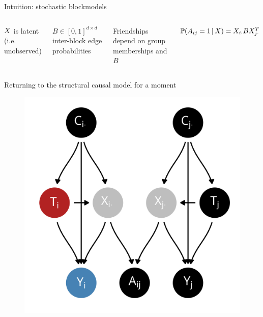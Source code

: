 \documentclass{beamer}
\theoremstyle{remark}
\begin{document}
\begin{frame}{Intuition: stochastic blockmodels}
\begin{columns}
        \vspace{4mm}

        $X$ is latent (i.e. unobserved)

        \vspace{4mm}

        $B \in [0, 1]^{d \times d}$ inter-block edge probabilities

        \vspace{4mm}

        Friendships depend on group memberships and $B$

        $\P[\X]{A_{ij} = 1} = \X_{i \cdot} B \X_{j \cdot}^T$

    \end{columns}

\end{frame}

\begin{frame}{Returning to the structural causal model for a moment}

    \centering

    \begin{figure}
        \includegraphics[scale=0.65]{figures/dags/homophily-mediating.png}
        \label{fig:homophily-mediating-again}
    \end{figure}

\end{frame}
\end{document}
